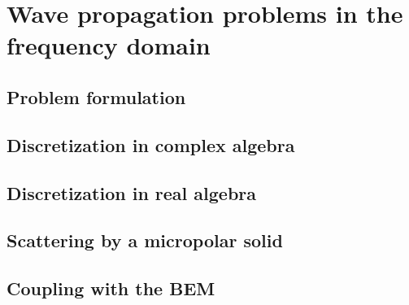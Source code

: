 %
\cleardoublepage {}
\chapter{Wave propagation problems in the frequency domain}
\section{Problem formulation}
\section{Discretization in complex algebra}
\section{Discretization in real algebra}
\section{Scattering by a micropolar solid}
\section{Coupling with the BEM}





